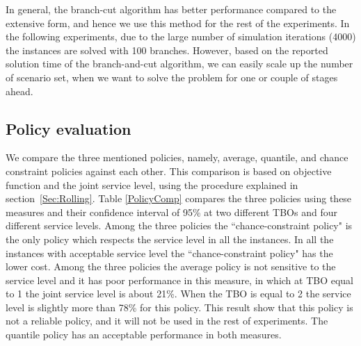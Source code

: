 \documentclass[10pt]{article}
\begin{document}
In general, the branch-cut algorithm has  better performance compared to the extensive form, and hence we use this method for the rest of the experiments. 
In the following experiments, due to the large number of simulation iterations (4000) the instances are solved with 100 branches. However, based on the reported solution time of the branch-and-cut algorithm, we can easily scale up the number of scenario set, when we want to solve the problem for one or couple of stages ahead.

\subsection{Policy evaluation}

We compare the three mentioned policies, namely, average, quantile, and chance constraint policies against each other.
This comparison is based on objective function and the joint service level, using the procedure explained in section~\ref{Sec:Rolling}. Table \ref{PolicyComp} compares the three policies using these measures and their confidence interval of 95\% at two different TBOs and four different service levels. Among the three policies the ``chance-constraint policy" is the only policy which respects the service level in all the instances. In all the instances with acceptable service level the ``chance-constraint policy" has the lower cost. Among the three policies the average policy is not sensitive to the service level and it has poor performance in this measure, in which at TBO equal to 1 the joint service level is about 21\%. When the TBO is equal to 2 the service level is slightly more than 78\% for this policy. This result show that this policy is not a reliable policy, and it will not be used in the rest of experiments. The quantile policy has an acceptable performance in both measures. 
\end{document}
